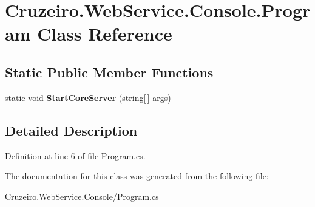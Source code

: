 \hypertarget{class_cruzeiro_1_1_web_service_1_1_console_1_1_program}{}\section{Cruzeiro.\+Web\+Service.\+Console.\+Program Class Reference}
\label{class_cruzeiro_1_1_web_service_1_1_console_1_1_program}
\subsection*{Static Public Member Functions}
\begin{DoxyCompactItemize}
\item 
static void {\bfseries Start\+Core\+Server} (string\mbox{[}$\,$\mbox{]} args)\hypertarget{class_cruzeiro_1_1_web_service_1_1_console_1_1_program_a20a4a71fee723b1e4ac9f6f8c2127579}{}\label{class_cruzeiro_1_1_web_service_1_1_console_1_1_program_a20a4a71fee723b1e4ac9f6f8c2127579}

\end{DoxyCompactItemize}


\subsection{Detailed Description}


Definition at line 6 of file Program.\+cs.



The documentation for this class was generated from the following file\+:\begin{DoxyCompactItemize}
\item 
Cruzeiro.\+Web\+Service.\+Console/Program.\+cs\end{DoxyCompactItemize}
